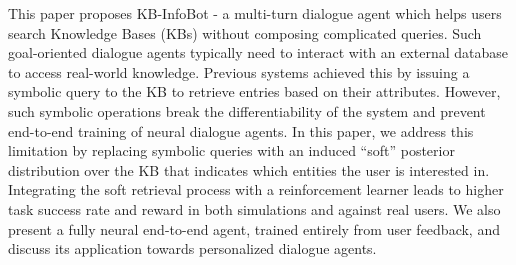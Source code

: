 This paper proposes KB-InfoBot - a multi-turn dialogue agent which helps users search Knowledge Bases (KBs) without composing complicated queries. Such goal-oriented dialogue agents typically need to interact with an external database to access real-world knowledge. Previous systems achieved this by issuing a symbolic query to the KB to retrieve entries based on their attributes. However, such symbolic operations break the differentiability of the system and prevent end-to-end training of neural dialogue agents. In this paper, we address this limitation by replacing symbolic queries with an induced ``soft'' posterior distribution over the KB that indicates which entities the user is interested in. Integrating the soft retrieval process with a reinforcement learner leads to higher task success rate and reward in both simulations and against real users. We also present a fully neural end-to-end agent, trained entirely from user feedback, and discuss its application towards personalized dialogue agents.
